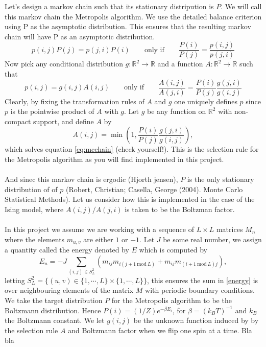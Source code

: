 \documentclass[11pt,english,a4paper]{article}
\begin{document}
Let's design a markov chain such that its stationary distripution is $P$. We will call this markov chain the Metropolis algorithm. We use the detailed balance criterion using P as the asymptotic distribution. This ensures that  the resulting markov chain will have P as an asymptotic distribution.
\[
p(i,j)P(j) = p(j,i)P(i) \qquad \text{only if} \qquad \frac{P(i)}{P(j)} = \frac{p(i,j)}{p(j,i)}
\]
Now pick any conditional distribution $g:\mathbb{R}^2 \to \mathbb{R}$ and a function $A: \mathbb{R}^2 \to \mathbb{R}$ such that
\begin{equation}
p(i,j) = g(i,j)A(i,j) \qquad \text{only if} \qquad \frac{A(i,j)}{A(j,i)} = \frac{P(i)}{P(j)} \frac{g(j,i)}{g(i,j)} \label{eq:mcchain}
\end{equation}
Clearly, by fixing the transformation rules of $A$ and $g$ one uniquely defines $p$ since $p$ is the pointwise product of $A$ with $g$. Let $g$ be any function on $\mathbb{R}^2$ with non-compact support, and define $A$ by
\begin{equation}
A(i,j) = \min \left( 1, \frac{P(i)}{P(j)} \frac{g(j,i)}{g(i,j)} \right),
\end{equation}
which solves equation \eqref{eq:mcchain} (check yourself!). This is the selection rule for the Metropolis algorithm as you will find implemented in this project.\\
\\
And sinec this markov chain is ergodic (Hjorth jensen), $P$ is the only stationary distribution of of $p$ (Robert, Christian; Casella, George (2004). Monte Carlo Statistical Methods). Let us consider how this is implemented in the case of the Ising model, where $A(i,j)/A(j,i)$ is taken to be the Boltzman factor.\\
\\
In this project we assume we are working with a sequence of $L \times L$ matrices $M_n$ where the elements $m_{u,v}$ are either $1$ or $-1$. Let $J$ be some real number, we assign a quantity called the energy denoted by $E$ which is computed by
\begin{equation}
E_n = -J \sum_{(i,j) \in S_L^2} (m_{ij} m_{i(j+1 \ \mathrm{mod} \ L)} + m_{ij} m_{(i+1 \ \mathrm{mod} \ L)j}), \label{energy}
\end{equation}
letting $S_L^2 = \big\{ (u,v) \in \{1,\cdots, L \}\times\{1,\cdots, L \} \big\}$, this ensures the sum in \eqref{energy} is over neighbouring elements of the matrix $M$ with periodic boundary conditions. We take the target distribution $P$ for the Metropolis algorithm to be the Boltzmann distribution. Hence $P(i) = (1/Z) e^{ -\beta E_i}$, for $\beta = (k_B T)^{  -1}$ and $k_B$ the Boltzmann constant. We let $g(i,j)$ be the unknown function induced by by the selection rule $A$ and Boltzmann factor when we flip one spin at a time. Bla bla\\
\end{document}
